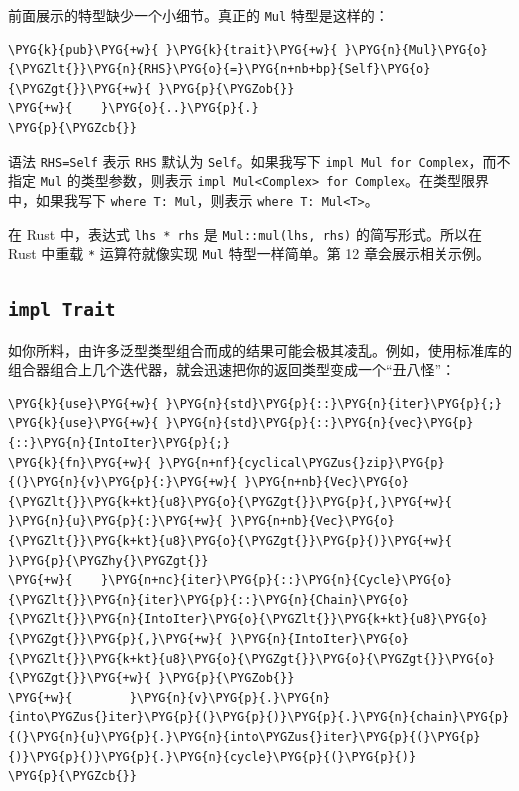 前面展示的特型缺少一个小细节。真正的 \texttt{Mul} 特型是这样的：

\begin{Verbatim}[commandchars=\\\{\},breaklines=true,breakanywhere=true,fontsize=\codefont,xleftmargin=17bp]
\PYG{k}{pub}\PYG{+w}{ }\PYG{k}{trait}\PYG{+w}{ }\PYG{n}{Mul}\PYG{o}{\PYGZlt{}}\PYG{n}{RHS}\PYG{o}{=}\PYG{n+nb+bp}{Self}\PYG{o}{\PYGZgt{}}\PYG{+w}{ }\PYG{p}{\PYGZob{}}
\PYG{+w}{    }\PYG{o}{..}\PYG{p}{.}
\PYG{p}{\PYGZcb{}}
\end{Verbatim}

语法 \texttt{RHS=Self} 表示 \texttt{RHS} 默认为 \texttt{Self}。如果我写下 \texttt{impl Mul for Complex}，而不指定 \texttt{Mul} 的类型参数，则表示 \texttt{impl Mul<Complex> for Complex}。在类型限界中，如果我写下 \texttt{where T: Mul}，则表示 \texttt{where T: Mul<T>}。

在 Rust 中，表达式 \texttt{lhs * rhs} 是 \texttt{Mul::mul(lhs, rhs)} 的简写形式。所以在 Rust 中重载 \texttt{*} 运算符就像实现 \texttt{Mul} 特型一样简单。第 12 章会展示相关示例。

\subsection{\texttt{impl Trait}}

如你所料，由许多泛型类型组合而成的结果可能会极其凌乱。例如，使用标准库的组合器组合上几个迭代器，就会迅速把你的返回类型变成一个“丑八怪”：

\begin{Verbatim}[commandchars=\\\{\},breaklines=true,breakanywhere=true,fontsize=\codefont,xleftmargin=17bp]
\PYG{k}{use}\PYG{+w}{ }\PYG{n}{std}\PYG{p}{::}\PYG{n}{iter}\PYG{p}{;}
\PYG{k}{use}\PYG{+w}{ }\PYG{n}{std}\PYG{p}{::}\PYG{n}{vec}\PYG{p}{::}\PYG{n}{IntoIter}\PYG{p}{;}
\PYG{k}{fn}\PYG{+w}{ }\PYG{n+nf}{cyclical\PYGZus{}zip}\PYG{p}{(}\PYG{n}{v}\PYG{p}{:}\PYG{+w}{ }\PYG{n+nb}{Vec}\PYG{o}{\PYGZlt{}}\PYG{k+kt}{u8}\PYG{o}{\PYGZgt{}}\PYG{p}{,}\PYG{+w}{ }\PYG{n}{u}\PYG{p}{:}\PYG{+w}{ }\PYG{n+nb}{Vec}\PYG{o}{\PYGZlt{}}\PYG{k+kt}{u8}\PYG{o}{\PYGZgt{}}\PYG{p}{)}\PYG{+w}{ }\PYG{p}{\PYGZhy{}\PYGZgt{}}
\PYG{+w}{    }\PYG{n+nc}{iter}\PYG{p}{::}\PYG{n}{Cycle}\PYG{o}{\PYGZlt{}}\PYG{n}{iter}\PYG{p}{::}\PYG{n}{Chain}\PYG{o}{\PYGZlt{}}\PYG{n}{IntoIter}\PYG{o}{\PYGZlt{}}\PYG{k+kt}{u8}\PYG{o}{\PYGZgt{}}\PYG{p}{,}\PYG{+w}{ }\PYG{n}{IntoIter}\PYG{o}{\PYGZlt{}}\PYG{k+kt}{u8}\PYG{o}{\PYGZgt{}}\PYG{o}{\PYGZgt{}}\PYG{o}{\PYGZgt{}}\PYG{+w}{ }\PYG{p}{\PYGZob{}}
\PYG{+w}{        }\PYG{n}{v}\PYG{p}{.}\PYG{n}{into\PYGZus{}iter}\PYG{p}{(}\PYG{p}{)}\PYG{p}{.}\PYG{n}{chain}\PYG{p}{(}\PYG{n}{u}\PYG{p}{.}\PYG{n}{into\PYGZus{}iter}\PYG{p}{(}\PYG{p}{)}\PYG{p}{)}\PYG{p}{.}\PYG{n}{cycle}\PYG{p}{(}\PYG{p}{)}
\PYG{p}{\PYGZcb{}}
\end{Verbatim}

